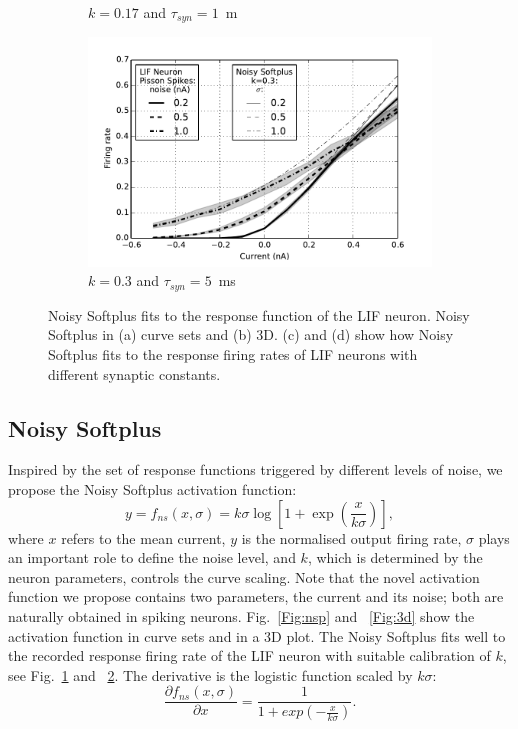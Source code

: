 \begin{figure}[htb!]
\begin{subfigure}[t]{0.4\textwidth}
		    \caption{$k=0.17$ and $\tau_{syn}=1$~m}
		    \label{Fig:nsptau1}
		\end{subfigure}
		\begin{subfigure}[t]{0.4\textwidth}
			\includegraphics[width=\textwidth]{pics_iconip/4-2.pdf}
		    \caption{$k=0.3$ and $\tau_{syn}=5$~ms}
		    \label{Fig:scale}
		\end{subfigure}

		\caption{
			Noisy Softplus fits to the response function of the LIF neuron.
			Noisy Softplus in (a) curve sets and (b) 3D.
			(c) and (d) show how Noisy Softplus fits to the response firing rates of LIF neurons with different synaptic constants.}
		\label{fig:nsp}
	\end{figure}
	
	\subsection{Noisy Softplus}
	Inspired by the set of response functions triggered by different levels of noise, we propose the Noisy Softplus activation function:
	\begin{equation}
	y = f_{ns}(x, \sigma) = k \sigma \log [1 + \exp(\frac{x}{k \sigma})],
	\label{equ:nsp}
	\end{equation}
	where $x$ refers to the mean current, $y$ is the normalised output firing rate, $\sigma$ plays an important role to define the noise level, and $k$, which is determined by the neuron parameters, controls the curve scaling.
	Note that the novel activation function we propose contains two parameters, the current and its noise; both are naturally obtained in spiking neurons.
	Fig.~\ref{Fig:nsp} and ~\ref{Fig:3d} show the activation function in curve sets and in a 3D plot.
	The Noisy Softplus fits well to the recorded response firing rate of the LIF neuron with suitable calibration of $k$, see Fig.~\ref{Fig:nsptau1} and ~\ref{Fig:scale}.
	The derivative is the logistic function scaled by $k\sigma$:
	\begin{equation}
	\frac{\partial f_{ns}(x,\sigma)}{\partial x} = \frac{1}{1+exp(-\frac{x}{k\sigma})}.
	\label{equ:logist}
	\end{equation}	
	
